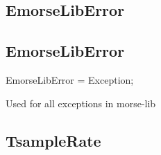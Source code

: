 \documentclass{report}
\newif\ifpdf
\begin{document}
\subsection*{\large{\textbf{EmorseLibError}}\normalsize\hspace{1ex}\hrulefill}
\else
\subsection*{EmorseLibError}
\fi
\label{morse.base-EmorseLibError}
\begin{list}{}{
\setlength{\itemindent}{0cm}
\setlength{\listparindent}{0cm}
\setlength{\leftmargin}{\evensidemargin}
\addtolength{\leftmargin}{\tmplength}
\settowidth{\labelsep}{X}
\addtolength{\leftmargin}{\labelsep}
\setlength{\labelwidth}{\tmplength}
}
\item[\textbf{Declaration}\hfill]
\ifpdf
\begin{flushleft}
\fi
\begin{ttfamily}
EmorseLibError = Exception;\end{ttfamily}

\ifpdf
\end{flushleft}
\fi

\par
\item[\textbf{Description}]
Used for all exceptions in morse{-}lib

\end{list}
\ifpdf
\subsection*{\large{\textbf{TsampleRate}}\normalsize\hspace{1ex}\hrulefill}
\else
\end{document}
